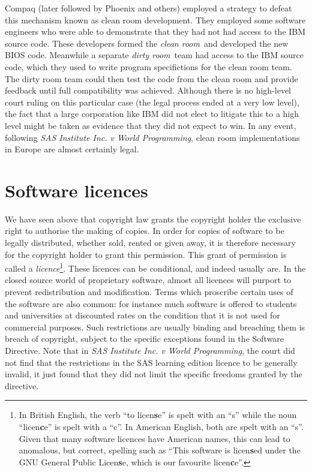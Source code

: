 \documentclass[a4paper,12pt]{article}
\begin{document}
Compaq (later followed by Phoenix and others) employed a strategy to defeat
this mechanism known as clean room development. They employed some software
engineers who were able to demonstrate that they had not had access to the
IBM source code. These developers formed the \emph{clean room}\ and
developed the new BIOS code. Meanwhile a separate \emph{dirty room}\ team
had access to the IBM source code, which they used to write program
specifictions for the clean room team. The dirty room team could then test
the code from the clean room and provide feedback until full compatibility
was achieved. Although there is no high-level court ruling on this
particular case (the legal process ended at a very low level), the fact that
a large corporation like IBM did not elect to litigate this to a high level
might be taken as evidence that they did not expect to win. In any event,
following \textit{SAS Institute Inc. v World Programming}, clean room
implementations in Europe are almost certainly legal.

\section{Software licences}

We have seen above that copyright law grants the copyright holder the
exclusive right to authorise the making of copies. In order for copies of
software to be legally distributed, whether sold, rented or given away, it
is therefore necessary for the copyright holder to grant this
permission. This grant of permission is called a \emph{licence}\footnote{In British English, the verb ``to licen\textbf{s}e'' is spelt with
  an ``s'' while the noun ``licen\textbf{c}e'' is spelt with a ``c''. In
  American English, both are spelt with an ``s''. Given that many software
  licences have American names, this can lead to anomalous, but correct, spelling such as
  ``This software is licen\textbf{s}ed under the GNU General Public Licen\textbf{s}e, which is
  our favourite licen\textbf{c}e''.}. These licences can be conditional, and
indeed usually are. In the closed source world of proprietary software,
almost all licences will purport to prevent redistribution and
modification. Terms which proscribe certain uses of the software are also
common: for instance much software is offered to students and universities
at discounted rates on the condition that it is not used for commercial
purposes. Such restrictions are usually binding and breaching them is breach
of copyright, subject to the specific exceptions found in the Software
Directive. Note that in \textit{SAS Institute Inc. v World Programming}, the
court did not find that the restrictions in the SAS learning edition licence
to be generally invalid, it just found that they did not limit the specific
freedoms granted by the directive. 
\end{document}
